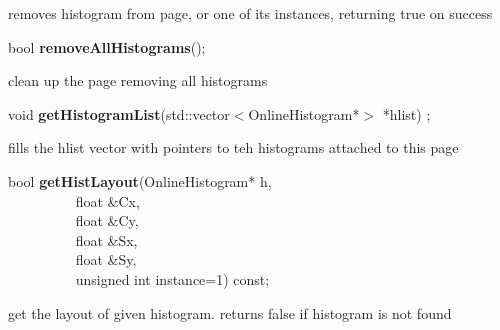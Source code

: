  removes histogram from page, or one of its instances, returning true on success


\item    bool {\bf removeAllHistograms}();


 clean up the page removing all histograms


\item    void {\bf getHistogramList}(std::vector$<$OnlineHistogram*$>$ *hlist) ;

 fills the hlist vector with pointers to teh histograms attached to this page


\item    bool {\bf getHistLayout}(OnlineHistogram* h,\\\mbox{}~~~~~~~~~
		     float \&Cx,\\\mbox{}~~~~~~~~~
		     float \&Cy,\\\mbox{}~~~~~~~~~
		     float \&Sx,\\\mbox{}~~~~~~~~~
		     float \&Sy,\\\mbox{}~~~~~~~~~
		     unsigned int instance=1) const;

 get the layout of given histogram. returns false if histogram is not found


